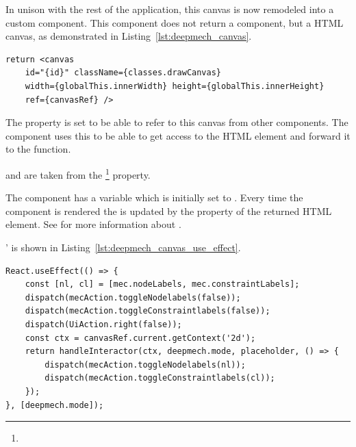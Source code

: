 In unison with the rest of the application, this canvas is now remodeled into a custom component.
This  component does not return a  component, but a HTML canvas, as demonstrated in Listing~\ref{lst:deepmech_canvas}.

\begin{lstlisting}[label={lst:deepmech_canvas}, caption={Return of the \code{DeepmechCanvas} component.}]
return <canvas
    id="{id}" className={classes.drawCanvas}
    width={globalThis.innerWidth} height={globalThis.innerHeight}
    ref={canvasRef} />
\end{lstlisting}

The  property is set to be able to refer to this canvas from other components.
The  component uses this  to be able to get access to the HTML element and forward it to the  function.

 and  are taken from the \footnote{} property.

The  component has a  variable which is initially set to .
Every time the  component is rendered the  is updated by the  property of the returned HTML element.
See  for more information about .

'  is shown in Listing~\ref{lst:deepmech_canvas_use_effect}.

\begin{lstlisting}[label={lst:deepmech_canvas_use_effect}, caption={The \code{useEffect} function in the \code{DeepmechCanvas} component.}]
React.useEffect(() => {
    const [nl, cl] = [mec.nodeLabels, mec.constraintLabels];
    dispatch(mecAction.toggleNodelabels(false));
    dispatch(mecAction.toggleConstraintlabels(false));
    dispatch(UiAction.right(false));
    const ctx = canvasRef.current.getContext('2d');
    return handleInteractor(ctx, deepmech.mode, placeholder, () => {
        dispatch(mecAction.toggleNodelabels(nl));
        dispatch(mecAction.toggleConstraintlabels(cl));
    });
}, [deepmech.mode]);
\end{lstlisting}

